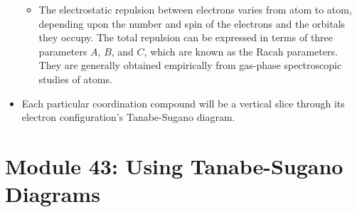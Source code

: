 \documentclass[../notes.tex]{subfiles}
\begin{document}
\begin{itemize}
\begin{itemize}
        \item The electrostatic repulsion between electrons varies from atom to atom, depending upon the number and spin of the electrons and the orbitals they occupy. The total repulsion can be expressed in terms of three parameters $A$, $B$, and $C$, which are known as the Racah parameters. They are generally obtained empirically from gas-phase spectroscopic studies of atoms.
    \end{itemize}
    \item Each particular coordination compound will be a vertical slice through its electron configuration's Tanabe-Sugano diagram.
\end{itemize}



\section{Module 43: Using Tanabe-Sugano Diagrams}
\end{document}
